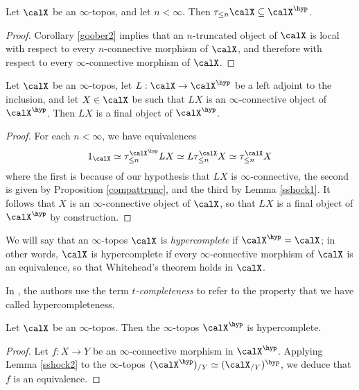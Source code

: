 \begin{lemma}\label{sshock1}
Let $\calX$ be an $\infty$-topos, and let $n < \infty$. Then
$\tau_{\leq n} \calX \subseteq \calX^{\hyp}$.
\end{lemma}

\begin{proof}
Corollary \ref{goober2} implies that an $n$-truncated object of $\calX$ is local with respect to every $n$-connective morphism of $\calX$, and therefore with respect to every $\infty$-connective morphism of $\calX$. 
\end{proof}

\begin{lemma}\label{sshock2}
Let $\calX$ be an $\infty$-topos, let $L: \calX \rightarrow \calX^{\hyp}$ be a left adjoint to the inclusion, and let $X \in \calX$ be such that $LX$ is an $\infty$-connective object of
$\calX^{\hyp}$. Then $LX$ is a final object of $\calX^{\hyp}$.
\end{lemma}

\begin{proof}
For each $n  < \infty$, we have equivalences
$$1_{\calX} \simeq \tau_{\leq n}^{\calX^{\hyp}} LX \simeq L \tau_{\leq n}^{\calX} X\simeq \tau_{\leq n}^{\calX} X$$
where the first is because of our hypothesis that $LX$ is $\infty$-connective, the second
is given by Proposition \ref{compattrunc}, and the third by Lemma \ref{sshock1}. It follows
that $X$ is an $\infty$-connective object of $\calX$, so that $LX$ is a final object of
$\calX^{\hyp}$ by construction.
\end{proof}

We will say that an $\infty$-topos $\calX$ is {\it hypercomplete} if $\calX^{\hyp} = \calX$; in
other words, $\calX$ is hypercomplete if every $\infty$-connective morphism of $\calX$ is an equivalence, so that Whitehead's theorem holds in $\calX$.

\begin{remark}
In \cite{toen}, the authors use the term {\it $t$-completeness} to refer to the property that we have called hypercompleteness.
\end{remark}

\begin{lemma}
Let $\calX$ be an $\infty$-topos. Then the $\infty$-topos $\calX^{\hyp}$ is hypercomplete.
\end{lemma}

\begin{proof}
Let $f: X \rightarrow Y$ be an $\infty$-connective morphism in $\calX^{\hyp}$. Applying
Lemma \ref{sshock2} to the $\infty$-topos $(\calX^{\hyp})_{/Y} \simeq (\calX_{/Y})^{\hyp}$, we deduce that $f$ is an equivalence.
\end{proof}

